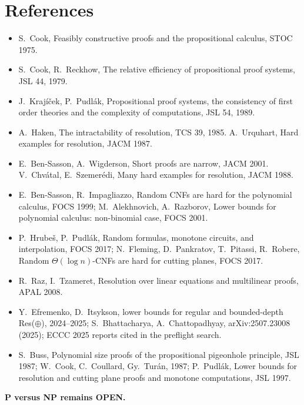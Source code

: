 \documentclass[11pt]{article}
\theoremstyle{definition}
\begin{document}
\section*{References}
\begin{itemize}\small
\item S.~Cook, Feasibly constructive proofs and the propositional calculus, STOC 1975.
\item S.~Cook, R.~Reckhow, The relative efficiency of propositional proof systems, JSL 44, 1979.
\item J.~Krajíček, P.~Pudlák, Propositional proof systems, the consistency of first order theories and the complexity of computations, JSL 54, 1989.
\item A.~Haken, The intractability of resolution, TCS 39, 1985. A.~Urquhart, Hard examples for resolution, JACM 1987.
\item E.~Ben-Sasson, A.~Wigderson, Short proofs are narrow, JACM 2001. V.~Chvátal, E.~Szemerédi, Many hard examples for resolution, JACM 1988.
\item E.~Ben-Sasson, R.~Impagliazzo, Random CNFs are hard for the polynomial calculus, FOCS 1999; M.~Alekhnovich, A.~Razborov, Lower bounds for polynomial calculus: non-binomial case, FOCS 2001.
\item P.~Hrubeš, P.~Pudlák, Random formulas, monotone circuits, and interpolation, FOCS 2017; N.~Fleming, D.~Pankratov, T.~Pitassi, R.~Robere, Random $\Theta(\log n)$-CNFs are hard for cutting planes, FOCS 2017.
\item R.~Raz, I.~Tzameret, Resolution over linear equations and multilinear proofs, APAL 2008.
\item Y.~Efremenko, D.~Itsykson, lower bounds for regular and bounded-depth Res($\oplus$), 2024--2025; S.~Bhattacharya, A.~Chattopadhyay, arXiv:2507.23008 (2025); ECCC 2025 reports cited in the preflight search.
\item S.~Buss, Polynomial size proofs of the propositional pigeonhole principle, JSL 1987; W.~Cook, C.~Coullard, Gy.~Turán, 1987; P.~Pudlák, Lower bounds for resolution and cutting plane proofs and monotone computations, JSL 1997.
\end{itemize}
\textbf{P versus NP remains OPEN.}
\end{document}
